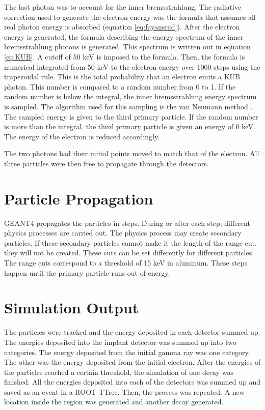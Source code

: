 \documentclass[../MaxHughesThesis.tex]{subfiles}
\begin{document}
The last photon was to account for the inner bremsstrahlung.
The radiative correction used to generate the electron energy was the formula that assumes all real photon energy is absorbed (equation \ref{eq:fayansrad}).
After the electron energy is generated, the formula describing the energy spectrum of the inner bremsstrahlung photons is generated. 
This spectrum is written out in equation \ref{eq:KUB}. %
A cutoff of 50 keV is imposed to the formula.
Then, the formula is numerical integrated from 50 keV to the electron energy over 1000 steps using the trapezoidal rule.
This is the total probability that an electron emits a KUB photon.
This number is compared to a random number from 0 to 1.
If the random number is below the integral, the inner bremsstrahlung energy spectrum is sampled.
The algorithm used for this sampling is the van Neumann method \cite{neu51}.
The sampled energy is given to the third primary particle.
If the random number is more than the integral, the third primary particle is given an energy of 0 keV.
The energy of the electron is reduced accordingly.

The two photons had their initial points moved to match that of the electron.
All three particles were then free to propagate through the detectors.

\section{Particle Propagation}  
GEANT4 propagates the particles in steps.
During or after each step, different physics processes are carried out.
The physics process may create secondary particles.
If these secondary particles cannot make it the length of the range cut, they will not be created.
These cuts can be set differently for different particles.
The range cuts correspond to a threshold of 15 keV in aluminum.
These steps happen until the primary particle runs out of energy.

\section{Simulation Output}
The particles were tracked and the energy deposited in each detector summed up.
The energies deposited into the implant detector was summed up into two categories.
The energy deposited from the initial gamma ray was one category.
The other was the energy deposited from the initial electron.
After the energies of the particles reached a certain threshold, the simulation of one decay was finished.
All the energies deposited into each of the detectors was summed up and saved as an event in a ROOT TTree.
Then, the process was repeated.
A new location inside the region was generated and another decay generated.
\end{document}
